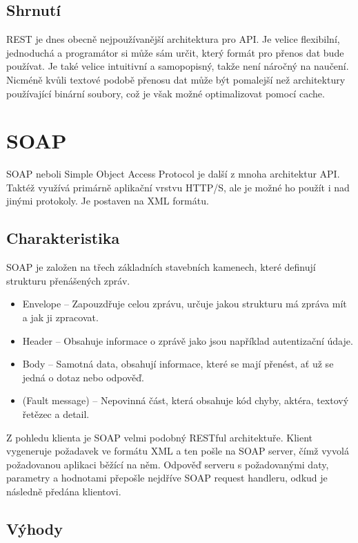\subsection{Shrnutí}
REST je dnes obecně nejpoužívanější architektura pro API. Je velice flexibilní, jednoduchá a programátor si může sám určit, který formát pro přenos dat bude používat. Je také velice intuitivní a samopopisný, takže není náročný na naučení. Nicméně kvůli textové podobě přenosu dat může být pomalejší než architektury používající binární soubory, což je však možné optimalizovat pomocí cache. \cite[]{devToApiStyles} \cite{phd:restful_api}\cite{restfulApi}


\section{SOAP}
SOAP neboli Simple Object Access Protocol je další z mnoha architektur API. Taktéž využívá primárně aplikační vrstvu HTTP/S, ale je možné ho použít i nad jinými protokoly. Je postaven na XML formátu.


\subsection{Charakteristika}
SOAP je založen na třech základních stavebních kamenech, které definují strukturu přenášených zpráv. \cite{soap}\cite{enwiki:1192016676}

\begin{itemize}
    \item Envelope -- Zapouzdřuje celou zprávu, určuje jakou strukturu má zpráva mít a jak ji zpracovat.
    \item Header -- Obsahuje informace o zprávě jako jsou například autentizační údaje.
    \item Body -- Samotná data, obsahují informace, které se mají přenést, ať už se jedná o dotaz nebo odpověď.
    \item (Fault message) -- Nepovinná část, která obsahuje kód chyby, aktéra, textový řetězec a detail.
\end{itemize}

Z pohledu klienta je SOAP velmi podobný RESTful architektuře. Klient vygeneruje požadavek ve formátu XML a ten pošle na SOAP server, čímž vyvolá požadovanou aplikaci běžící na něm. Odpověď serveru s požadovanými daty, parametry a hodnotami přepošle nejdříve SOAP request handleru, odkud je následně předána klientovi.

\subsection{Výhody}

